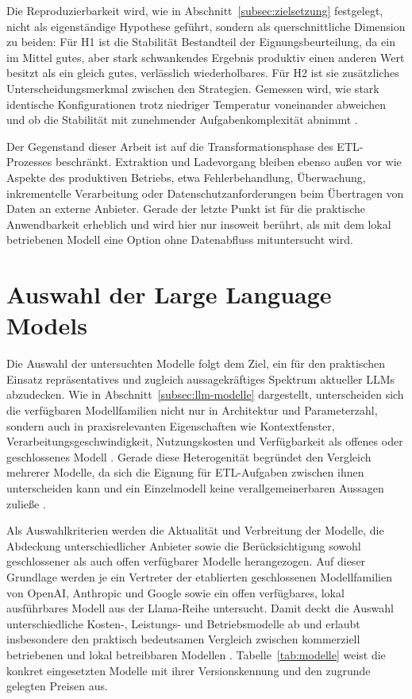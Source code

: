 Die Reproduzierbarkeit wird, wie in Abschnitt~\ref{subsec:zielsetzung} festgelegt, nicht als eigenständige Hypothese geführt, sondern als querschnittliche Dimension zu beiden: Für H1 ist die Stabilität Bestandteil der Eignungsbeurteilung, da ein im Mittel gutes, aber stark schwankendes Ergebnis produktiv einen anderen Wert besitzt als ein gleich gutes, verlässlich wiederholbares. Für H2 ist sie zusätzliches Unterscheidungsmerkmal zwischen den Strategien. Gemessen wird, wie stark identische Konfigurationen trotz niedriger Temperatur voneinander abweichen und ob die Stabilität mit zunehmender Aufgabenkomplexität abnimmt \autocite{zhaoSurveyLargeLanguage2026,hassaniRoleChatGPTData2023}.

Der Gegenstand dieser Arbeit ist auf die Transformationsphase des \ac{ETL}-Prozesses beschränkt. Extraktion und Ladevorgang bleiben ebenso außen vor wie Aspekte des produktiven Betriebs, etwa Fehlerbehandlung, Überwachung, inkrementelle Verarbeitung oder Datenschutzanforderungen beim Übertragen von Daten an externe Anbieter. Gerade der letzte Punkt ist für die praktische Anwendbarkeit erheblich und wird hier nur insoweit berührt, als mit dem lokal betriebenen Modell eine Option ohne Datenabfluss mituntersucht wird.

\section{Auswahl der Large Language Models}
\label{sec:modellauswahl}

Die Auswahl der untersuchten Modelle folgt dem Ziel, ein für den praktischen Einsatz repräsentatives und zugleich aussagekräftiges Spektrum aktueller \acp{LLM} abzudecken. Wie in Abschnitt~\ref{subsec:llm-modelle} dargestellt, unterscheiden sich die verfügbaren Modellfamilien nicht nur in Architektur und Parameterzahl, sondern auch in praxisrelevanten Eigenschaften wie Kontextfenster, Verarbeitungsgeschwindigkeit, Nutzungskosten und Verfügbarkeit als offenes oder geschlossenes Modell \autocite{zhaoSurveyLargeLanguage2026,2026AIIndex}. Gerade diese Heterogenität begründet den Vergleich mehrerer Modelle, da sich die Eignung für \ac{ETL}-Aufgaben zwischen ihnen unterscheiden kann und ein Einzelmodell keine verallgemeinerbaren Aussagen zuließe \autocite{ComparisonAIModels,2026AIIndex}.

Als Auswahlkriterien werden die Aktualität und Verbreitung der Modelle, die Abdeckung unterschiedlicher Anbieter sowie die Berücksichtigung sowohl geschlossener als auch offen verfügbarer Modelle herangezogen. Auf dieser Grundlage werden je ein Vertreter der etablierten geschlossenen Modellfamilien von OpenAI, Anthropic und Google sowie ein offen verfügbares, lokal ausführbares Modell aus der Llama-Reihe untersucht. Damit deckt die Auswahl unterschiedliche Kosten-, Leistungs- und Betriebsmodelle ab und erlaubt insbesondere den praktisch bedeutsamen Vergleich zwischen kommerziell betriebenen und lokal betreibbaren Modellen \autocite{zhaoSurveyLargeLanguage2026,2026AIIndex}. Tabelle~\ref{tab:modelle} weist die konkret eingesetzten Modelle mit ihrer Versionskennung und den zugrunde gelegten Preisen aus.

